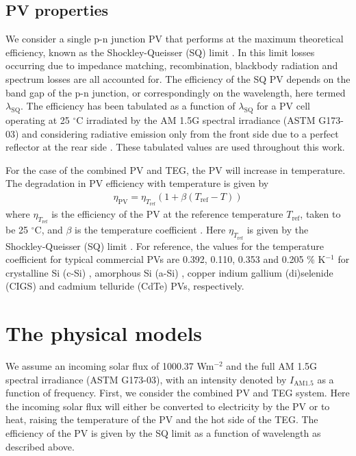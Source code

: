 \documentclass[fleqn,10pt]{SelfArx} %
\newcommand{\n}[1]{\mathrm{#1}}
\begin{document}
\subsection{PV properties}
We consider a single p-n junction PV that performs at the maximum theoretical efficiency, known as the Shockley-Queisser (SQ) limit \cite{Shockley_1961}. In this limit losses occurring due to impedance matching, recombination, blackbody radiation and spectrum losses are all accounted for. The efficiency of the SQ PV depends on the band gap of the p-n junction, or correspondingly on the wavelength, here termed $\lambda_\n{SQ}$. The efficiency has been tabulated as a function of $\lambda_\n{SQ}$ for a PV cell operating at 25 $^\circ$C irradiated by the AM 1.5G spectral irradiance (ASTM G173-03) and considering radiative emission only from the front side due to a perfect reflector at the rear side \cite{Ruhle_2016}. These tabulated values are used throughout this work.

For the case of the combined PV and TEG, the PV will increase in temperature. The degradation in PV efficiency with temperature is given by
\begin{eqnarray}
\eta_\n{PV} = \eta_{T_\n{ref}}\left(1+\beta(T_\n{ref}-T)\right)\label{eq_eff_PV}
\end{eqnarray}
where $\eta_{T_\n{ref}}$ is the efficiency of the PV at the reference temperature $T_\n{ref}$, taken to be 25 $^\circ$C, and $\beta$ is the temperature coefficient \cite{Skoplaki_2009}. Here $\eta_{T_\n{ref}}$ is given by the Shockley-Queisser (SQ) limit \cite{Ruhle_2016}. For reference, the values for the temperature coefficient for typical commercial PVs are 0.392, 0.110, 0.353 and 0.205 \% K$^{-1}$ for crystalline Si (c-Si) \cite{Skoplaki_2009}, amorphous Si (a-Si) \cite{Skoplaki_2009}, copper indium gallium (di)selenide (CIGS) \cite{TSMC_2015,Hulk_2015,Solibro_2015} and cadmium telluride (CdTe) \cite{Singh_2012} PVs, respectively.


\section{The physical models}\label{Sec_model}
We assume an incoming solar flux of 1000.37 Wm$^{-2}$ and the full AM 1.5G spectral irradiance (ASTM G173-03), with an intensity denoted by $I_\n{AM1.5}$ as a function of frequency. First, we consider the combined PV and TEG system. Here the incoming solar flux will either be converted to electricity by the PV or to heat, raising the temperature of the PV and the hot side of the TEG.  The efficiency of the PV is given by the SQ limit as a function of wavelength as described above.
\end{document}
